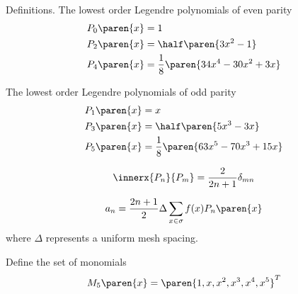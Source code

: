 Definitions. The lowest order Legendre polynomials of even parity
  \begin{equation}
    \begin{split}
      P_{0}\paren{x} &= 1 \\
      P_{2}\paren{x} &= \half \paren{3x^{2} - 1} \\
      P_{4}\paren{x} &= \frac{1}{8} \paren{34x^{4} - 30x^{2} + 3x} \\
    \end{split}
  \end{equation}
  
The lowest order Legendre polynomials of odd parity
  \begin{equation}
    \begin{split}
      P_{1}\paren{x} &= x \\
      P_{3}\paren{x} &= \half \paren{5x^{3} - 3x} \\
      P_{5}\paren{x} &= \frac{1}{8} \paren{63x^{5} - 70x^{3} + 15x} \\
    \end{split}
  \end{equation}

  \begin{equation}
    \innerx{P_{n}}{P_{m}} = \frac{2} {2n + 1} \delta_{mn}
  \end{equation}

  \begin{equation}
    a_{n} = \frac{2n + 1} {2} \Delta \sum_{x\in\sigma} f(x) P_{n}\paren{x}
  \end{equation}
where $\Delta$ represents a uniform mesh spacing.

Define the set of monomials
  \begin{equation}
    M_{5}\paren{x} = \paren{1, x, x^{2}, x^{3}, x^{4}, x^{5}}^{T}
  \end{equation}

